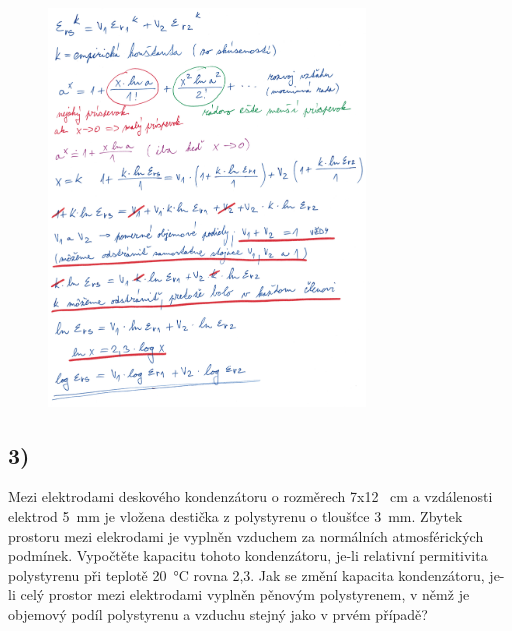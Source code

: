 \begin{figure}[h]
    \centering
    \includegraphics*[width=0.75\textwidth]{images/diel2.jpg}
\end{figure}

\newpage


\subsection*{3)}
Mezi elektrodami deskového kondenzátoru o rozměrech 7x12 \SI{}{\centi\meter} a vzdálenosti elektrod \SI{5}{\milli\meter} je vložena destička z polystyrenu o tloušťce \SI{3}{\milli\meter}. Zbytek prostoru mezi elekrodami je vyplněn vzduchem za normálních atmosférických podmínek. Vypočtěte kapacitu tohoto kondenzátoru, je-li relativní permitivita polystyrenu při teplotě \SI{20}{\degreeCelsius} rovna 2,3. Jak se změní kapacita kondenzátoru, je-li celý prostor mezi elektrodami vyplněn pěnovým polystyrenem, v němž je objemový podíl polystyrenu a vzduchu stejný jako v prvém případě?

